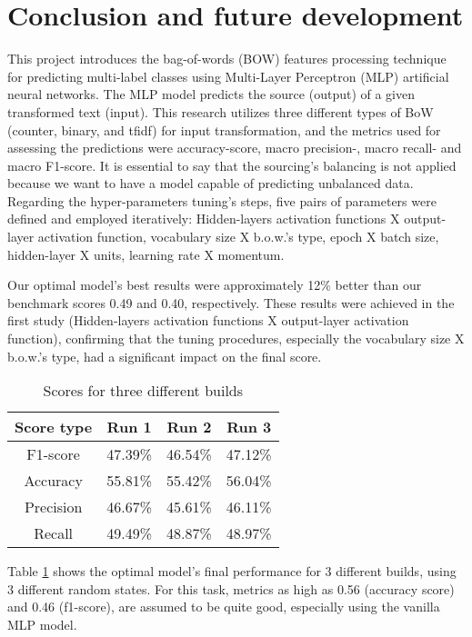 \section{Conclusion and future development}
\label{chap:Conclusion and future development}

\quad This project introduces the bag-of-words (BOW) features processing technique for predicting multi-label classes using Multi-Layer Perceptron (MLP) artificial neural networks. The MLP model predicts the source (output) of a given transformed text (input). This research utilizes three different types of BoW (counter, binary, and tfidf) for input transformation, and the metrics used for assessing the predictions were accuracy-score, macro precision-, macro recall- and macro F1-score. It is essential to say that the sourcing's balancing is not applied because we want to have a model capable of predicting unbalanced data. Regarding the hyper-parameters tuning's steps, five pairs of parameters were defined and employed iteratively: Hidden-layers activation functions X output-layer activation function, vocabulary size X b.o.w.'s type, epoch X batch size, hidden-layer X units, learning rate X momentum.

Our optimal model's best results were approximately 12\% better than our benchmark scores 0.49 and 0.40, respectively. These results were achieved in the first study (Hidden-layers activation functions X output-layer activation function), confirming that the tuning procedures, especially the vocabulary size X b.o.w.'s type, had a significant impact on the final score.

\begin{table}[h]
    \centering
    \begin{tabular}{c|c|c|c}
        Score type & \textbf{Run 1}   &  \textbf{Run 2}    &  \textbf{Run 3}  \\
        \hline
        F1-score   & 47.39\% & 46.54\% & 47.12\%\\
        Accuracy   & 55.81\% & 55.42\% & 56.04\%\\
        Precision  & 46.67\% & 45.61\% & 46.11\%\\
        Recall     & 49.49\% & 48.87\% & 48.97\%\\
    \end{tabular}
    \caption{Scores for three different builds}
    \label{tab:3runs}
\end{table}

Table \ref{tab:3runs} shows the optimal model's final performance for 3 different builds, using 3 different random states. For this task, metrics as high as 0.56 (accuracy score) and 0.46 (f1-score), are assumed to be quite good, especially using the vanilla MLP model.

